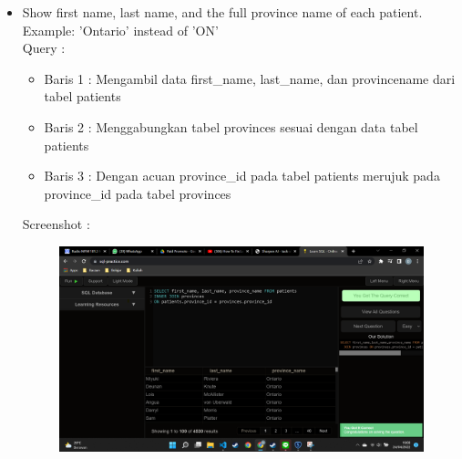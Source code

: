 \documentclass[]{article}
\begin{document}
\begin{itemize}
        \item Show first name, last name, and the full province name of each patient. Example: 'Ontario' instead of 'ON'
        \\Query :
        
        \begin{itemize}
            \item Baris 1 : Mengambil data first\_name, last\_name, dan provincename dari tabel patients
            \item Baris 2 : Menggabungkan tabel provinces sesuai dengan data tabel patients
            \item Baris 3 : Dengan acuan province\_id pada tabel patients merujuk pada province\_id pada tabel provinces
        \end{itemize}
        \pagebreak
        Screenshot :
        \begin{figure}[h]
            \includegraphics[scale=0.3]{./Screenshot/Easy-7.png}
            \centering
        \end{figure}


\end{itemize}
\end{document}
